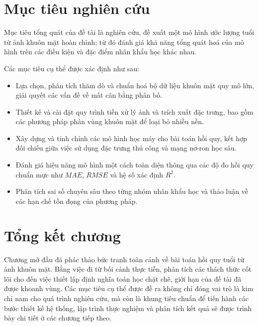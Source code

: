 \section{Mục tiêu nghiên cứu}
Mục tiêu tổng quát của đề tài là nghiên cứu, đề xuất một mô hình ước lượng tuổi từ ảnh khuôn mặt hoàn chỉnh; từ đó đánh giá khả năng tổng quát hoá của mô hình trên các điều kiện và đặc điểm nhân khẩu học khác nhau.

Các mục tiêu cụ thể được xác định như sau:
\begin{itemize}
    \item Lựa chọn, phân tích thăm dò và chuẩn hoá bộ dữ liệu khuôn mặt quy mô lớn, giải quyết các vấn đề về mất cân bằng phân bố.
    \item Thiết kế và cài đặt quy trình tiền xử lý ảnh và trích xuất đặc trưng, bao gồm các phương pháp phân vùng khuôn mặt để loại bỏ nhiễu nền.
    \item Xây dựng và tinh chỉnh các mô hình học máy cho bài toán hồi quy, kết hợp đối chiếu giữa việc sử dụng đặc trưng thủ công và mạng nơ-ron học sâu.
    \item Đánh giá hiệu năng mô hình một cách toàn diện thông qua các độ đo hồi quy chuẩn mực như $MAE$, $RMSE$ và hệ số xác định $R^2$.
    \item Phân tích sai số chuyên sâu theo từng nhóm nhân khẩu học và thảo luận về các hạn chế tồn đọng của phương pháp.
\end{itemize}

\section{Tổng kết chương}
Chương mở đầu đã phác thảo bức tranh toàn cảnh về bài toán hồi quy tuổi từ ảnh khuôn mặt. Bằng việc đi từ bối cảnh thực tiễn, phân tích các thách thức cốt lõi cho đến việc thiết lập định nghĩa toán học chặt chẽ, giới hạn của đề tài đã được khoanh vùng. Các mục tiêu cụ thể được đề ra không chỉ đóng vai trò là kim chỉ nam cho quá trình nghiên cứu, mà còn là khung tiêu chuẩn để tiến hành các bước thiết kế hệ thống, lập trình thực nghiệm và phân tích kết quả sẽ được trình bày chi tiết ở các chương tiếp theo.